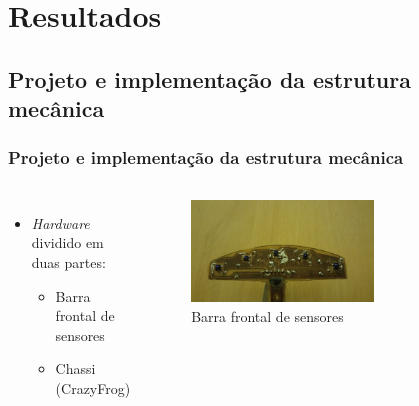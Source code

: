 \section{Resultados}


\subsection{Projeto e implementação da estrutura mecânica}

\begin{frame}
\frametitle{Projeto e implementação da estrutura mecânica}
\begin{columns}

	\begin{itemize}
	\item \textit{Hardware} dividido em duas partes:
		\begin{itemize}
		\item Barra frontal de sensores
		\item Chassi (CrazyFrog)
		\end{itemize}
	\end{itemize}
	
	\begin{figure}[th]
	\centering
	\captionsetup{width=0.65\textwidth,font=footnotesize,textfont=bf}
	\includegraphics[width=0.65\textwidth,keepaspectratio]{Figuras/Barraluz.jpg}
	\caption{Barra frontal de sensores}
	\end{figure}

\end{columns}
\end{frame}


